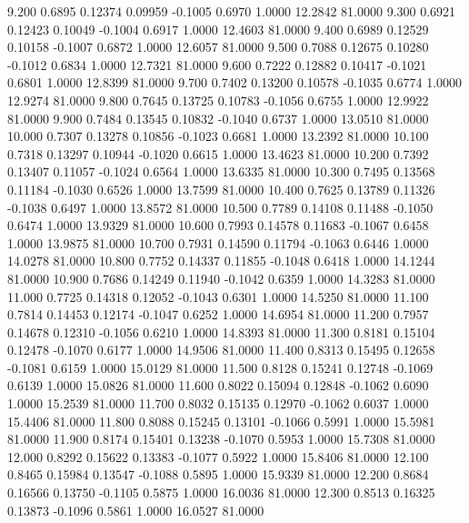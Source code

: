    9.200   0.6895   0.12374   0.09959  -0.1005   0.6970   1.0000  12.2842  81.0000
   9.300   0.6921   0.12423   0.10049  -0.1004   0.6917   1.0000  12.4603  81.0000
   9.400   0.6989   0.12529   0.10158  -0.1007   0.6872   1.0000  12.6057  81.0000
   9.500   0.7088   0.12675   0.10280  -0.1012   0.6834   1.0000  12.7321  81.0000
   9.600   0.7222   0.12882   0.10417  -0.1021   0.6801   1.0000  12.8399  81.0000
   9.700   0.7402   0.13200   0.10578  -0.1035   0.6774   1.0000  12.9274  81.0000
   9.800   0.7645   0.13725   0.10783  -0.1056   0.6755   1.0000  12.9922  81.0000
   9.900   0.7484   0.13545   0.10832  -0.1040   0.6737   1.0000  13.0510  81.0000
  10.000   0.7307   0.13278   0.10856  -0.1023   0.6681   1.0000  13.2392  81.0000
  10.100   0.7318   0.13297   0.10944  -0.1020   0.6615   1.0000  13.4623  81.0000
  10.200   0.7392   0.13407   0.11057  -0.1024   0.6564   1.0000  13.6335  81.0000
  10.300   0.7495   0.13568   0.11184  -0.1030   0.6526   1.0000  13.7599  81.0000
  10.400   0.7625   0.13789   0.11326  -0.1038   0.6497   1.0000  13.8572  81.0000
  10.500   0.7789   0.14108   0.11488  -0.1050   0.6474   1.0000  13.9329  81.0000
  10.600   0.7993   0.14578   0.11683  -0.1067   0.6458   1.0000  13.9875  81.0000
  10.700   0.7931   0.14590   0.11794  -0.1063   0.6446   1.0000  14.0278  81.0000
  10.800   0.7752   0.14337   0.11855  -0.1048   0.6418   1.0000  14.1244  81.0000
  10.900   0.7686   0.14249   0.11940  -0.1042   0.6359   1.0000  14.3283  81.0000
  11.000   0.7725   0.14318   0.12052  -0.1043   0.6301   1.0000  14.5250  81.0000
  11.100   0.7814   0.14453   0.12174  -0.1047   0.6252   1.0000  14.6954  81.0000
  11.200   0.7957   0.14678   0.12310  -0.1056   0.6210   1.0000  14.8393  81.0000
  11.300   0.8181   0.15104   0.12478  -0.1070   0.6177   1.0000  14.9506  81.0000
  11.400   0.8313   0.15495   0.12658  -0.1081   0.6159   1.0000  15.0129  81.0000
  11.500   0.8128   0.15241   0.12748  -0.1069   0.6139   1.0000  15.0826  81.0000
  11.600   0.8022   0.15094   0.12848  -0.1062   0.6090   1.0000  15.2539  81.0000
  11.700   0.8032   0.15135   0.12970  -0.1062   0.6037   1.0000  15.4406  81.0000
  11.800   0.8088   0.15245   0.13101  -0.1066   0.5991   1.0000  15.5981  81.0000
  11.900   0.8174   0.15401   0.13238  -0.1070   0.5953   1.0000  15.7308  81.0000
  12.000   0.8292   0.15622   0.13383  -0.1077   0.5922   1.0000  15.8406  81.0000
  12.100   0.8465   0.15984   0.13547  -0.1088   0.5895   1.0000  15.9339  81.0000
  12.200   0.8684   0.16566   0.13750  -0.1105   0.5875   1.0000  16.0036  81.0000
  12.300   0.8513   0.16325   0.13873  -0.1096   0.5861   1.0000  16.0527  81.0000
